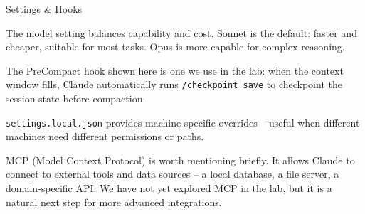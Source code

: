 \documentclass[aspectratio=169, 10pt]{beamer}
\begin{document}
\begin{frame}[fragile]{Settings \& Hooks}
{  The model setting balances capability and cost. Sonnet is the default: faster and cheaper, suitable for most tasks. Opus is more capable for complex reasoning.\par
  The PreCompact hook shown here is one we use in the lab: when the context window fills, Claude automatically runs \texttt{/checkpoint save} to checkpoint the session state before compaction.\par
  \texttt{settings.local.json} provides machine-specific overrides -- useful when different machines need different permissions or paths.\par
  MCP (Model Context Protocol) is worth mentioning briefly. It allows Claude to connect to external tools and data sources -- a local database, a file server, a domain-specific API. We have not yet explored MCP in the lab, but it is a natural next step for more advanced integrations.}
\end{frame}

\end{document}
